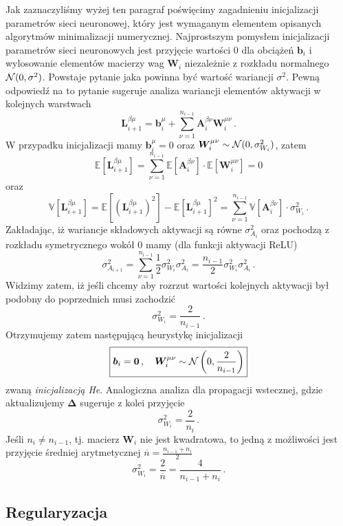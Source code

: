 \documentclass{myclass}
\numberwithin{equation}{subsection}
\begin{document}
Jak zaznaczyliśmy wyżej ten paragraf poświęcimy zagadnieniu inicjalizacji parametrów sieci
neuronowej, który jest wymaganym elementem opisanych algorytmów minimalizacji numerycznej.
Najprostszym pomysłem inicjalizacji parametrów sieci neuronowych jest przyjęcie wartości 0 dla
obciążeń \(\bm{b}_i\) i wylosowanie elementów macierzy wag \(\bm{W}_i\) niezależnie z rozkładu
normalnego \(\mathcal{N}(0, \sigma^2)\). Powstaje pytanie jaka powinna być wartość wariancji
\(\sigma^2\). Pewną odpowiedź na to pytanie sugeruje analiza wariancji elementów aktywacji w
kolejnych warstwach
\[
\bm{L}_{i+1}^{\beta\mu} = \bm{b}_i^{\mu} + \sum_{\nu=1}^{n_{i-1}} \bm{A}_i^{\beta\nu} \bm{W}_i^{\mu\nu}\,.
\]
W przypadku inicjalizacji mamy \(\bm{b}_i^\mu = 0\) oraz \(\bm{W}_i^{\mu\nu} \sim \mathcal{N}(0,
\sigma_{W_i}^2)\), zatem
\[
\mathbb{E}\left[\bm{L}_{i+1}^{\beta\mu}\right] = \sum_{\nu=1}^{n_{i-1}} \mathbb{E}\left[\bm{A}_i^{\beta\nu}\right] \cdot \mathbb{E}\left[\bm{W}_i^{\mu\nu}\right] = 0
\]
oraz
\[
\mathbb{V}\left[\bm{L}_{i+1}^{\beta\mu}\right] = \mathbb{E}\left[(\bm{L}_{i+1}^{\beta\mu})^2\right] - \mathbb{E}\left[\bm{L}_{i+1}^{\beta\mu}\right]^2 = \sum_{\nu=1}^{n_{i-1}} \mathbb{V}\left[\bm{A}_i^{\beta\nu}\right] \cdot \sigma_{W_i}^2\,.
\]
Zakładając, iż wariancje składowych aktywacji są równe \(\sigma_{A_i}^2\) oraz pochodzą z rozkładu
symetrycznego wokół 0 mamy (dla funkcji aktywacji ReLU)
\[
\sigma_{A_{i+1}}^2 = \sum_{\nu=1}^{n_{i-1}} \frac{1}{2}\sigma_{W_i}^2 \sigma_{A_i}^2 = \frac{n_{i-1}}{2}\sigma_{W_i}^2 \sigma_{A_i}^2\,.
\]
Widzimy zatem, iż jeśli chcemy aby rozrzut wartości kolejnych aktywacji był podobny do poprzednich
musi zachodzić
\[
\sigma_{W_i}^2 = \frac{2}{n_{i-1}}\,.
\]
Otrzymujemy zatem następującą heurystykę inicjalizacji
\[
\boxed
{
\bm{b}_i = \bm{0}\,,\quad \bm{W}_i^{\mu\nu} \sim \mathcal{N}\left(0, \frac{2}{n_{i-1}}\right)
}
\]
zwaną \emph{inicjalizacją He}. Analogiczna analiza dla propagacji wstecznej, gdzie aktualizujemy
\(\bm{\Delta}\) sugeruje z kolei przyjęcie
\[
\sigma_{W_i}^2 = \frac{2}{n_i}\,.
\]
Jeśli \(n_i \neq n_{i-1}\), tj. macierz \(\bm{W}_i\) nie jest kwadratowa, to jedną z możliwości jest
przyjęcie średniej arytmetycznej \(\overline{n} = \frac{n_{i-1} + n_i}{2}\)
\[
\sigma_{W_i}^2 = \frac{2}{\overline{n}} = \frac{4}{n_{i-1} + n_i}\,.
\]


\subsection{Regularyzacja}
\end{document}
